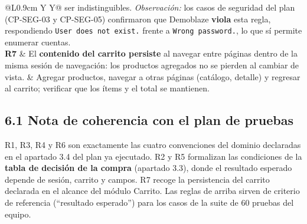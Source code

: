 \begin{table}[htb]
\begin{tabularx}{\textwidth}{@{}L{0.9cm} Y Y@{}}
ser indistinguibles. \emph{Observación:} los casos de seguridad del plan (CP-SEG-03 y
CP-SEG-05) confirmaron que Demoblaze \textbf{viola} esta regla, respondiendo
\texttt{User does not exist.} frente a \texttt{Wrong password.}, lo que sí permite
enumerar cuentas. \\
\textbf{R7} & El \textbf{contenido del carrito persiste} al navegar entre páginas
dentro de la misma sesión de navegación: los productos agregados no se pierden al
cambiar de vista. &
Agregar productos, navegar a otras páginas (catálogo, detalle) y regresar al carrito;
verificar que los ítems y el total se mantienen. \\
\bottomrule
\end{tabularx}
\end{table}
\endgroup

\subsection*{6.1 Nota de coherencia con el plan de pruebas}

R1, R3, R4 y R6 son exactamente las cuatro convenciones del dominio declaradas en el
apartado 3.4 del plan ya ejecutado. R2 y R5 formalizan las condiciones de la
\textbf{tabla de decisión de la compra} (apartado 3.3), donde el resultado esperado
depende de sesión, carrito y campos. R7 recoge la persistencia del carrito declarada en
el alcance del módulo Carrito. Las reglas de arriba sirven de criterio de referencia
(``resultado esperado'') para los casos de la suite de 60 pruebas del equipo.

